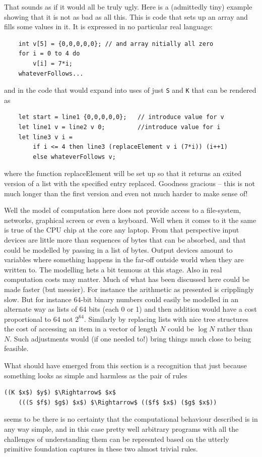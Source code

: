That sounds as if it would all be truly ugly. Here is a (admittedly tiny)
example showing that it is not as bad as all this. This is code that sets
up an array and fills some values in it. It is expressed in no particular real
language:
\begin{verbatim}
    int v[5] = {0,0,0,0,0}; // and array nitially all zero
    for i = 0 to 4 do
        v[i] = 7*i;
    whateverFollows...
\end{verbatim}
and in the code that would expand into uses of just \verb+S+ and \verb+K+ that
can be rendered as
\begin{verbatim}
    let start = line1 {0,0,0,0,0};   // introduce value for v
    let line1 v = line2 v 0;         //introduce value for i
    let line3 v i =
        if i <= 4 then line3 (replaceElement v i (7*i)) (i++1)
        else whateverFollows v;
\end{verbatim}
where the function replaceElement will be set up so that it returns an exited
version of a list with the specified entry replaced. Goodness gracious -- this
is not much longer than the first version and even not much harder to
make sense of! 

Well the model of computation here does not provide access to a file-system,
networks, graphical screen or even a keyboard. Well when it comes to it the
same is true of the CPU chip at the core any laptop. From that perspective
input devices are little more than sequences of bytes that can be absorbed,
and that could be modelled by passing in a list of bytes. Output devices
amount to variables where something happens in the far-off outside world
when they are written to. The modelling hets a bit tenuous at this stage.
Also in real computation costs may matter. Much of what has been discussed
here could be made faster (but messier). For instance the arithmetic as
presented is cripplingly slow. But for instance 64-bit binary numbers could
easily be modelled in an alternate way as lists of 64 bits (each 0 or 1)
and then addition would have a cost proportional to 64 not $2^{64}$.
Similarly by replacing lists with nice tree structures the cost of
accessing an item in a vector of length $N$ could be $\log N$ rather than $N$.
Such adjustments would (if one needed to!) bring things much close to being
feasible.
 
What should have emerged from this section is a recognition that
just because something looks as simple and harmless as the
pair of rules
\begin{lstlisting}[mathescape=true]
    ((K $x$) $y$) $\Rightarrow$ $x$
    (((S $f$) $g$) $x$) $\Rightarrow$ (($f$ $x$) ($g$ $x$))
\end{lstlisting}
seems to be there is no certainty that the computational behaviour
described is in any way simple, and in this case pretty well arbitrary
programs with all the challenges of understanding them can be
represnted based on the utterly primitive foundation captures in these
two almost trivial rules.

